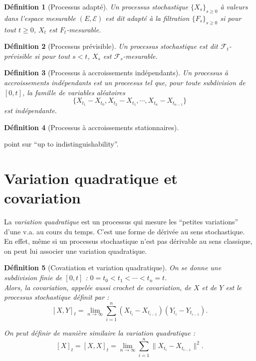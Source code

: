 \documentclass[openany]{book}
\newcommand{\F}{\mathscr{F}}
\newcommand{\carE}{\mathscr{E}}
\newcommand{\1}{\mathbbm{1}}
\theoremstyle{thmfont}
\theoremstyle{deffont}
\newtheorem{definition}[definition]{Définition}
\theoremstyle{thmfont}
\theoremstyle{deffont}
\begin{document}

\begin{definition}[Processus adapté] Un processus stochastique $\{X_s\}_{s\ge0}$ à valeurs dans l'espace mesurable $(E, \carE)$ est dit \textit{adapté} à la filtration $\{F_s\}_{s\geq0}$ si pour tout $t\geq0$, $X_t$ est $F_t$-mesurable.
\label{def:pr_adapte}
\end{definition}

\begin{definition}[Processus prévisible] Un processus stochastique est dit $\F_t$-\textit{prévisible} si pour tout $s < t$, $X_s$ est $\F_s$-mesurable.
\label{def:pr_previsible}
\end{definition}


\begin{definition}[Processus à accroissements indépendants]
  \label{def:pr_accr_indep} Un processus à \textit{accroissements indépendants} est un proceesus tel que, pour toute subdivision de $[0,t]$, la famille de variables aléatoires
    $$\{X_{t_1} - X_{t_0}, X_{t_2} - X_{t_1}, \cdots ,X_{t_n} - X_{t_{n-1}}\}$$
    est indépendante.
\end{definition}

{\color{red}
\begin{definition}[Processus à accroissements stationnaires]
        \label{def:pr_accr_sta}

\end{definition}
    
  point sur ``up to indistinguishability''.
}

\section{Variation quadratique et covariation}

La \textit{variation quadratique} est un processus qui mesure les ``petites variations'' d'une v.a. au cours du temps. C'est une forme de dérivée au sens stochastique. En effet, même si un processus stochastique n'est pas dérivable au sens classique, on peut lui associer une variation quadratique. 

\begin{definition}[Covatiation et variation quadratique] On se donne une subdivision finie de $[0,t]$ :  $0 = t_0 < t_1 < \cdots < t_n = t$.\\
  Alors, la \textit{covariation}, appelée aussi \textit{crochet de covariation}, de $X$ et de $Y$ est le processus stochastique définit par :
  $$[X,Y]_t = \lim_{n\to \infty} \sum_{i = 1}^n(X_{t_i} - X_{t_{i-1}})(Y_{t_i} - Y_{t_{i-1}}).$$

 On peut définir de manière similaire la \textit{variation quadratique} :
 $$[X]_t = [X,X]_t = \lim_{n\to \infty} \sum_{i = 1}^n\|X_{t_i} - X_{t_{i-1}}\|^2.$$
\label{def:crochet}
\end{definition}
\end{document}
